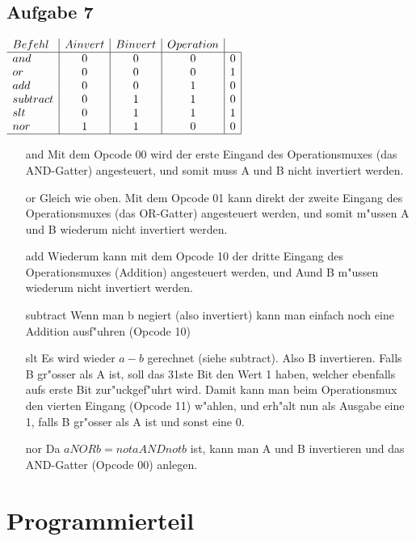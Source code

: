 \documentclass[a4paper,abstracton]{scrartcl}
\begin{document}
\subsection{Aufgabe 7}
$\begin{array}{l|c|c|c|c|}
Befehl & A invert & B invert & Operation\\
\hline
and &0&0&0&0\\
or &0&0&0&1\\
add &0&0&1&0\\
subtract &0&1&1&0\\
slt &0&1&1&1\\
nor &1&1&0&0\\
\hline
\end{array}$\\
\begin{itemize}
	\item[and] Mit dem Opcode 00 wird der erste Eingand des Operationsmuxes (das AND-Gatter) angesteuert, 
	und somit muss A und B nicht invertiert werden.
	\item[or] Gleich wie oben. Mit dem Opcode 01 kann direkt der zweite Eingang des Operationsmuxes (das OR-Gatter) 
	angesteuert werden, und somit m"ussen A und B wiederum nicht invertiert werden.
	\item[add] Wiederum kann mit dem Opcode 10 der dritte Eingang des Operationsmuxes (Addition) angesteuert werden, 
	und Aund B m"ussen wiederum nicht invertiert werden.
	\item[subtract] Wenn man b negiert (also invertiert) kann man einfach noch eine Addition ausf"uhren (Opcode 10)
	\item[slt] Es wird wieder $a-b$ gerechnet (siehe subtract). Also B invertieren. 
	Falls B gr"osser als A ist, soll das 31ste Bit den Wert 1 haben, welcher ebenfalls aufs erste Bit zur"uckgef"uhrt wird. 
	Damit kann man beim Operationsmux den vierten Eingang (Opcode 11) w"ahlen, und erh"alt nun als Ausgabe eine 1, 
	falls B gr"osser als A ist und sonst eine 0.
	\item[nor] Da $ a NOR b = not a AND not b $ ist, kann man A und B invertieren und das AND-Gatter (Opcode 00) anlegen.
\end{itemize}

\newpage

\section{Programmierteil}

\newpage

\newpage

\end{document}
